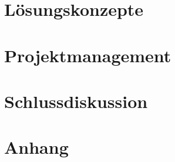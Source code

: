 \documentclass[11pt]{scrartcl}
\begin{document}
        \section{Lösungskonzepte}
        
        \clearpage
        
        \clearpage
        
        \clearpage
        
        \clearpage
        
        \clearpage
        
        \clearpage
        
        \clearpage
        
        \clearpage
        
        \clearpage
        
        \clearpage
        
        \clearpage
        \section{Projektmanagement}
        
        \clearpage
        \section{Schlussdiskussion}
        
        \clearpage
        \section{Anhang}
        
        \clearpage

        

    
\end{document}
